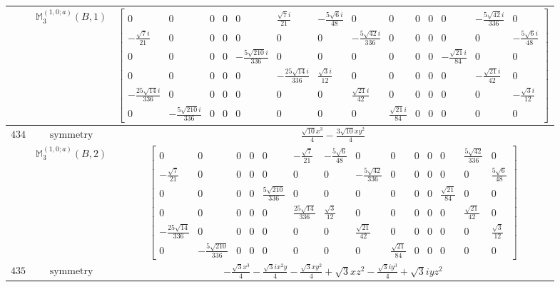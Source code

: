 \documentclass[fleqn,8pt,landscape]{jsarticle}
\begin{document}
\begin{longtable}{ccc}
$  $ & $ \mathbb{M}_{3}^{(1,0;a)}(B,1) $ & $ \begin{bmatrix} 0 & 0 & 0 & 0 & 0 & \frac{\sqrt{7} i}{21} & - \frac{5 \sqrt{6} i}{48} & 0 & 0 & 0 & 0 & 0 & - \frac{5 \sqrt{42} i}{336} & 0 \\ - \frac{\sqrt{7} i}{21} & 0 & 0 & 0 & 0 & 0 & 0 & - \frac{5 \sqrt{42} i}{336} & 0 & 0 & 0 & 0 & 0 & - \frac{5 \sqrt{6} i}{48} \\ 0 & 0 & 0 & 0 & - \frac{5 \sqrt{210} i}{336} & 0 & 0 & 0 & 0 & 0 & 0 & - \frac{\sqrt{21} i}{84} & 0 & 0 \\ 0 & 0 & 0 & 0 & 0 & - \frac{25 \sqrt{14} i}{336} & \frac{\sqrt{3} i}{12} & 0 & 0 & 0 & 0 & 0 & - \frac{\sqrt{21} i}{42} & 0 \\ - \frac{25 \sqrt{14} i}{336} & 0 & 0 & 0 & 0 & 0 & 0 & \frac{\sqrt{21} i}{42} & 0 & 0 & 0 & 0 & 0 & - \frac{\sqrt{3} i}{12} \\ 0 & - \frac{5 \sqrt{210} i}{336} & 0 & 0 & 0 & 0 & 0 & 0 & \frac{\sqrt{21} i}{84} & 0 & 0 & 0 & 0 & 0 \end{bmatrix} $ \\ \hline
$ 434 $ & $ \text{symmetry} $ & $ \frac{\sqrt{10} x^{3}}{4} - \frac{3 \sqrt{10} x y^{2}}{4} $ \\
$  $ & $ \mathbb{M}_{3}^{(1,0;a)}(B,2) $ & $ \begin{bmatrix} 0 & 0 & 0 & 0 & 0 & - \frac{\sqrt{7}}{21} & - \frac{5 \sqrt{6}}{48} & 0 & 0 & 0 & 0 & 0 & \frac{5 \sqrt{42}}{336} & 0 \\ - \frac{\sqrt{7}}{21} & 0 & 0 & 0 & 0 & 0 & 0 & - \frac{5 \sqrt{42}}{336} & 0 & 0 & 0 & 0 & 0 & \frac{5 \sqrt{6}}{48} \\ 0 & 0 & 0 & 0 & \frac{5 \sqrt{210}}{336} & 0 & 0 & 0 & 0 & 0 & 0 & \frac{\sqrt{21}}{84} & 0 & 0 \\ 0 & 0 & 0 & 0 & 0 & \frac{25 \sqrt{14}}{336} & \frac{\sqrt{3}}{12} & 0 & 0 & 0 & 0 & 0 & \frac{\sqrt{21}}{42} & 0 \\ - \frac{25 \sqrt{14}}{336} & 0 & 0 & 0 & 0 & 0 & 0 & \frac{\sqrt{21}}{42} & 0 & 0 & 0 & 0 & 0 & \frac{\sqrt{3}}{12} \\ 0 & - \frac{5 \sqrt{210}}{336} & 0 & 0 & 0 & 0 & 0 & 0 & \frac{\sqrt{21}}{84} & 0 & 0 & 0 & 0 & 0 \end{bmatrix} $ \\ \hline
$ 435 $ & $ \text{symmetry} $ & $ - \frac{\sqrt{3} x^{3}}{4} - \frac{\sqrt{3} i x^{2} y}{4} - \frac{\sqrt{3} x y^{2}}{4} + \sqrt{3} x z^{2} - \frac{\sqrt{3} i y^{3}}{4} + \sqrt{3} i y z^{2} $ \\

\end{longtable}
\end{document}
